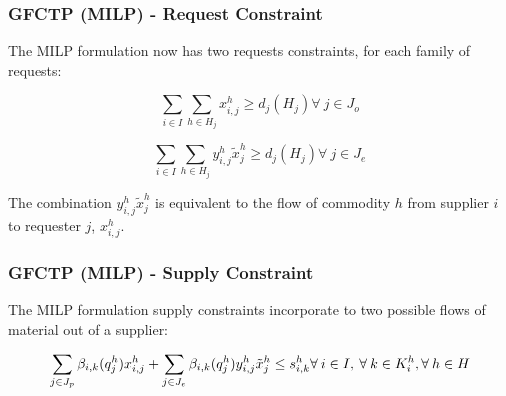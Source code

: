 \begin{frame}[ctb!]
  \frametitle{GFCTP (MILP) - Request Constraint} 

  The MILP formulation now has two requests constraints, for each family of
  requests:

  \begin{equation}
    \sum_{i \in I}\sum_{h \in H_{j}} x_{i,j}^{h} \geq d_{j}(H_{j})
    \forall \: j \in J_{o}
  \end{equation}
  
  \begin{equation}    
    \sum_{i \in I}\sum_{h \in H_{j}} y_{i,j}^{h} \tilde{x}_{j}^{h} \geq d_{j}(H_{j}) 
    \forall \: j \in J_{e}
  \end{equation}

  The combination $y_{i,j}^{h} \tilde{x}_{j}^{h}$ is equivalent to the flow of
  commodity $h$ from supplier $i$ to requester $j$, $x^h_{i,j}$.
\end{frame}

\begin{frame}[ctb!]
  \frametitle{GFCTP (MILP) - Supply Constraint} 

  The MILP formulation supply constraints incorporate to two possible flows of
  material out of a supplier:
  
  \begin{equation}    
    \sum_{j \in J_{p}}\beta_{i,k}(q_{j}^{h}) x_{i,j}^{h}
    + \sum_{j \in J_{e}}\beta_{i,k}(q_{j}^{h}) y_{i,j}^{h} \tilde{x}_{j}^{h} \leq s_{i,k}^{h}\\
    \forall \: i \in I, \: \forall \: k \in K_{i}^{h}, \forall \: {h \in H}
  \end{equation}
  
\end{frame}


